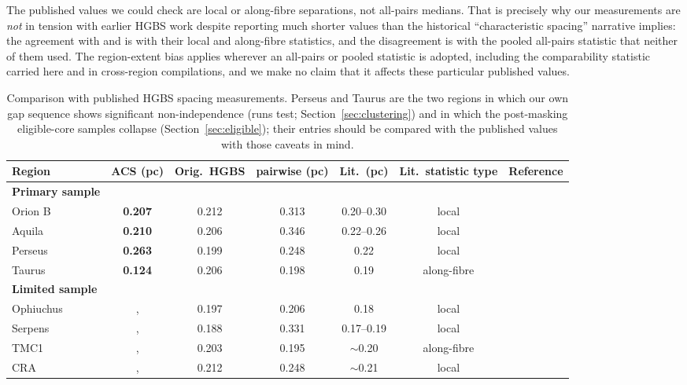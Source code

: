 \documentclass[usenatbib,twoside,twocolumn]{mnras}
\begin{document}
The published values we could check are local or along-fibre separations, not all-pairs medians. That is precisely why our measurements are \emph{not} in tension with earlier HGBS work despite reporting much shorter values than the historical ``characteristic spacing'' narrative implies: the agreement with \citet{Konyves2020} and \citet{Hacar2013} is with their local and along-fibre statistics, and the disagreement is with the pooled all-pairs statistic that neither of them used. The region-extent bias applies wherever an all-pairs or pooled statistic is adopted, including the comparability statistic carried here and in cross-region compilations, and we make no claim that it affects these particular published values.

\begin{table}
\caption{Comparison with published HGBS spacing measurements. Perseus and Taurus are the two regions in which our own gap sequence shows significant non-independence (runs test; Section~\ref{sec:clustering}) and in which the post-masking eligible-core samples collapse (Section~\ref{sec:eligible}); their entries should be compared with the published values with those caveats in mind.}
\label{tab:literature}
\setlength{\tabcolsep}{4pt}
\footnotesize
\setlength{\tabcolsep}{2.5pt}
\begin{tabular}{lcccccc}
\toprule
Region & ACS (pc) & Orig.\ HGBS & pairwise (pc) & Lit.\ (pc) & \textbf{Lit.\ statistic type} & Reference \\
\midrule
\textbf{Primary sample} &  &  &  &  &  &  \\
Orion B & \textbf{0.207} & 0.212 & 0.313 & 0.20--0.30 & local & \citet{Konyves2020} \\
Aquila  & \textbf{0.210} & 0.206 & 0.346 & 0.22--0.26 & local & \citet{Konyves2015} \\
Perseus & \textbf{0.263} & 0.199 & 0.248 & 0.22 & local & \citet{Pezzuto2021} \\
Taurus  & \textbf{0.124} & 0.206 & 0.198 & 0.19 & along-fibre & \citet{Hacar2013} \\
\midrule
\textbf{Limited sample} &  &  &  &  &  &  \\
Ophiuchus &, & 0.197 & 0.206 & 0.18 & local & \citet{Konyves2020} \\
Serpens  &, & 0.188 & 0.331 & 0.17--0.19 & local & \citet{Konyves2020} \\
TMC1     &, & 0.203 & 0.195 & $\sim$0.20 & along-fibre & \citet{Hacar2013} \\
CRA      &, & 0.212 & 0.248 & $\sim$0.21 & local & \citet{Konyves2020} \\
\bottomrule
\end{tabular}


\end{table}
\end{document}
